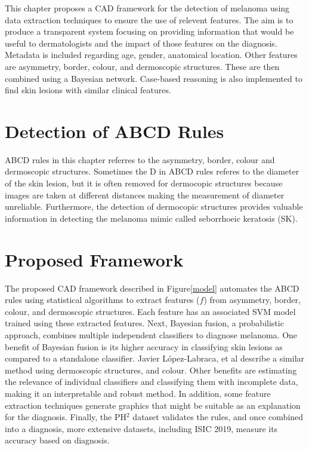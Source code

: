 This chapter proposes a CAD framework for the detection of melanoma using data extraction techniques to ensure the use of relevent features. The aim is to produce a transparent system focusing on providing information that would be useful to dermatologists and the impact of those features on the diagnosis. Metadata is included regarding age, gender, anatomical location. Other features are asymmetry, border, colour, and dermoscopic structures. These are then combined using a Bayesian network. Case-based reasoning is also implemented to find skin lesions with similar clinical features.

\section{Detection of ABCD Rules}
ABCD rules in this chapter referres to the asymmetry, border, colour and dermoscopic structures. Sometimes the D in ABCD rules referes to the diameter of the skin lesion, but it is often removed for dermocopic structures because images are taken at different distances making the measurement of diameter unreliable. Furthermore, the detection of dermocopic structures provides valuable information in detecting the melanoma mimic called seborrhoeic keratosis (SK)\cite{Minagawa2017}. 

\section{Proposed Framework}
The proposed CAD framework described in Figure\ref{model} automates the ABCD rules using statistical algorithms to extract features ($f$) from asymmetry, border, colour, and dermoscopic structures. Each feature has an associated SVM model trained using these extracted features. Next, Bayesian fusion, a probabilistic approach, combines multiple independent classifiers to diagnose melanoma. One benefit of Bayesian fusion is its higher accuracy in classifying skin lesions as compared to a standalone classifier\cite{Takruri2017}.  Javier López-Labraca, et al describe a similar method using dermoscopic structures, and colour\cite{Lopez-Labraca2018}. Other benefits are estimating the relevance of individual classifiers and classifying them with incomplete data, making it an interpretable and robust method. In addition, some feature extraction techniques generate graphics that might be suitable as an explanation for the diagnosis. Finally, the PH$^2$ dataset validates the rules, and once combined into a diagnosis, more extensive datasets, including ISIC 2019, measure its accuracy based on diagnosis.


